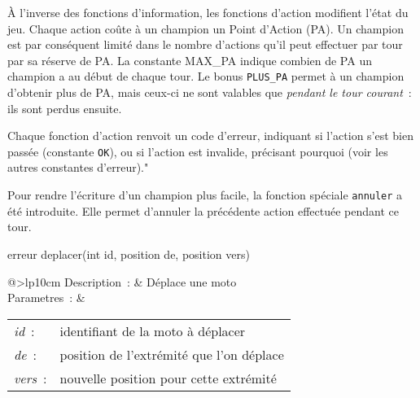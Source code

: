 À l’inverse des fonctions d’information, les fonctions d’action modifient
l’état du jeu. Chaque action coûte à un champion un Point d’Action
(PA). Un champion est par conséquent limité dans le nombre d’actions qu’il
peut effectuer par tour par sa réserve de PA. La constante MAX\_PA indique
combien de PA un champion a au début de chaque tour. Le bonus
\texttt{PLUS\_PA} permet à un champion d’obtenir plus de PA, mais ceux-ci
ne sont valables que \emph{pendant le tour courant}~: ils sont perdus
ensuite.

Chaque fonction d’action renvoit un code d’erreur, indiquant si l’action
s’est bien passée (constante \texttt{OK}), ou si l’action est invalide,
précisant pourquoi (voir les autres constantes d’erreur)."

Pour rendre l’écriture d’un champion plus facile, la fonction spéciale
\texttt{annuler} a été introduite. Elle permet d’annuler la précédente
action effectuée pendant ce tour.

\begin{minipage}{\linewidth}

\begin{lst-c++}
erreur deplacer(int id, position de, position vers)
\end{lst-c++}

\noindent
\begin{tabular}[t]{@{\extracolsep{0pt}}>{\bfseries}lp{10cm}}
Description~: & Déplace une moto \\


Parametres~: &
\begin{tabular}[t]{@{\extracolsep{0pt}}ll}
    
    
      
        \textsl{id}~: & identifiant de la moto à déplacer \\
      
    
      
        \textsl{de}~: & position de l'extrémité que l'on déplace \\
      
    
      
        \textsl{vers}~: & nouvelle position pour cette extrémité \\
      
    
  \end{tabular} \\






\end{tabular} \\[0.3cm]
\end{minipage}


